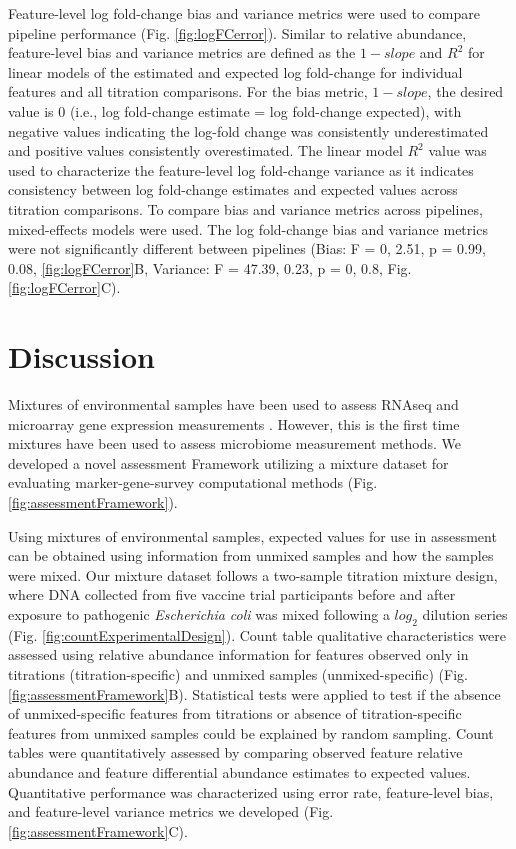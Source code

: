 \documentclass{bmcart}
\begin{document}
Feature-level log fold-change bias and variance metrics were used to
compare pipeline performance (Fig. \ref{fig:logFCerror}). Similar to
relative abundance, feature-level bias and variance metrics are defined
as the \(1 - slope\) and \(R^2\) for linear models of the estimated and
expected log fold-change for individual features and all titration
comparisons. For the bias metric, \(1 - slope\), the desired value is 0
(i.e., log fold-change estimate = log fold-change expected), with
negative values indicating the log-fold change was consistently
underestimated and positive values consistently overestimated. The
linear model \(R^2\) value was used to characterize the feature-level
log fold-change variance as it indicates consistency between log
fold-change estimates and expected values across titration comparisons.
To compare bias and variance metrics across pipelines, mixed-effects
models were used. The log fold-change bias and variance metrics were not
significantly different between pipelines (Bias: F = 0, 2.51, p = 0.99,
0.08, \ref{fig:logFCerror}B, Variance: F = 47.39, 0.23, p = 0, 0.8, Fig.
\ref{fig:logFCerror}C).


\section*{Discussion}
Mixtures of environmental samples have been used to assess
RNAseq and microarray gene expression measurements \cite{parsons2015using, pine2011adaptable, thompson2005use}.
However, this is the first time mixtures have been used to assess microbiome measurement
methods. We developed a novel assessment Framework utilizing a mixture dataset
for evaluating marker-gene-survey computational methods (Fig. \ref{fig:assessmentFramework}).

Using mixtures of environmental samples, expected values for use in assessment
can be obtained using information from unmixed samples and how the samples were mixed.
Our mixture dataset follows a
two-sample titration mixture design, where DNA collected from five vaccine trial participants before and
after exposure to pathogenic \emph{Escherichia coli}  was mixed following a \(log_2\) dilution
series (Fig. \ref{fig:countExperimentalDesign}).
Count table qualitative characteristics were assessed using relative abundance information for
features observed only in titrations (titration-specific) and unmixed samples (unmixed-specific) (Fig. \ref{fig:assessmentFramework}B).
Statistical tests were applied to test if the absence of unmixed-specific features from titrations or absence of titration-specific features from unmixed samples could be explained by random sampling.
Count tables were quantitatively assessed by comparing observed feature relative abundance and feature differential abundance estimates to expected values.
Quantitative performance was characterized using error rate, feature-level bias, and feature-level variance metrics we developed (Fig. \ref{fig:assessmentFramework}C).
\end{document}
